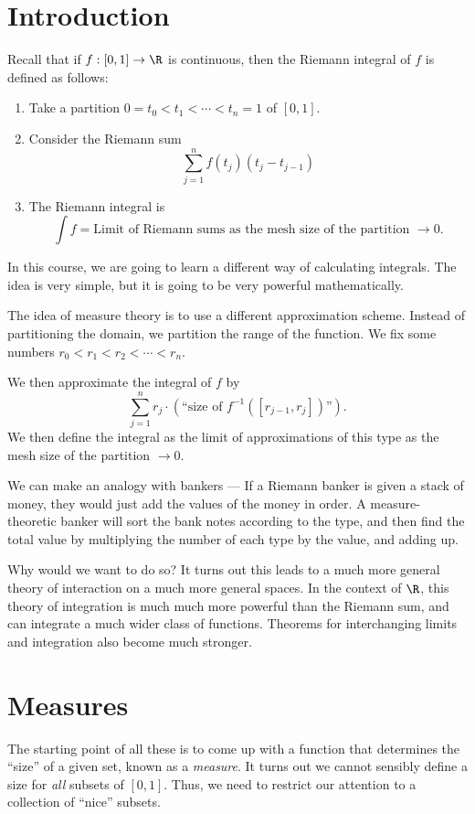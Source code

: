 \documentclass[a4paper]{article}
\begin{document}
\tableofcontents
\setcounter{section}{-1}
\section{Introduction}
Recall that if $f: [0, 1] \to \R$ is continuous, then the Riemann integral of $f$ is defined as follows:
\begin{enumerate}
  \item Take a partition $0 = t_0 < t_1 < \cdots < t_n = 1$ of $[0, 1]$.
  \item Consider the Riemann sum
    \[
      \sum_{j = 1}^n f(t_j) (t_j - t_{j - 1})
    \]
  \item The Riemann integral is
    \[
      \int f = \text{Limit of Riemann sums as the mesh size of the partition }\to 0.
    \]
\end{enumerate}

In this course, we are going to learn a different way of calculating integrals. The idea is very simple, but it is going to be very powerful mathematically.

The idea of measure theory is to use a different approximation scheme. Instead of partitioning the domain, we partition the range of the function. We fix some numbers $r_0 < r_1 < r_2 < \cdots < r_n$.


We then approximate the integral of $f$ by
\[
  \sum_{j = 1}^n r_j \cdot (\text{``size of }f^{-1}([r_{j - 1}, r_j])\text{''}).
\]
We then define the integral as the limit of approximations of this type as the mesh size of the partition $\to 0$.

We can make an analogy with bankers --- If a Riemann banker is given a stack of money, they would just add the values of the money in order. A measure-theoretic banker will sort the bank notes according to the type, and then find the total value by multiplying the number of each type by the value, and adding up.

Why would we want to do so? It turns out this leads to a much more general theory of interaction on a much more general spaces. In the context of $\R$, this theory of integration is much much more powerful than the Riemann sum, and can integrate a much wider class of functions. Theorems for interchanging limits and integration also become much stronger.

\section{Measures}
The starting point of all these is to come up with a function that determines the ``size'' of a given set, known as a \emph{measure}. It turns out we cannot sensibly define a size for \emph{all} subsets of $[0, 1]$. Thus, we need to restrict our attention to a collection of ``nice'' subsets.
\end{document}
